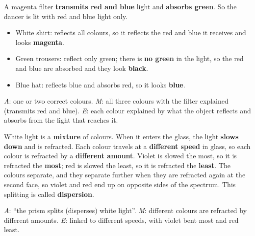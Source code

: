 \documentclass[11pt]{article}
\begin{document}
 A magenta filter \textbf{transmits red and blue} light and \textbf{absorbs green}. So the dancer is lit with red and blue light only.
\begin{itemize}
\item White shirt: reflects all colours, so it reflects the red and blue it receives and looks \textbf{magenta}.
\item Green trousers: reflect only green; there is \textbf{no green} in the light, so the red and blue are absorbed and they look \textbf{black}.
\item Blue hat: reflects blue and absorbs red, so it looks \textbf{blue}.
\end{itemize}
\emph{A}: one or two correct colours. \emph{M}: all three colours with the filter explained (transmits red and blue). \emph{E}: each colour explained by what the object reflects and absorbs from the light that reaches it.

 White light is a \textbf{mixture} of colours. When it enters the glass, the light \textbf{slows down} and is refracted. Each colour travels at a \textbf{different speed} in glass, so each colour is refracted by a \textbf{different amount}. Violet is slowed the most, so it is refracted the \textbf{most}; red is slowed the least, so it is refracted the \textbf{least}. The colours separate, and they separate further when they are refracted again at the second face, so violet and red end up on opposite sides of the spectrum. This splitting is called \textbf{dispersion}.\par
\emph{A}: ``the prism splits (disperses) white light''. \emph{M}: different colours are refracted by different amounts. \emph{E}: linked to different speeds, with violet bent most and red least.
\end{document}
